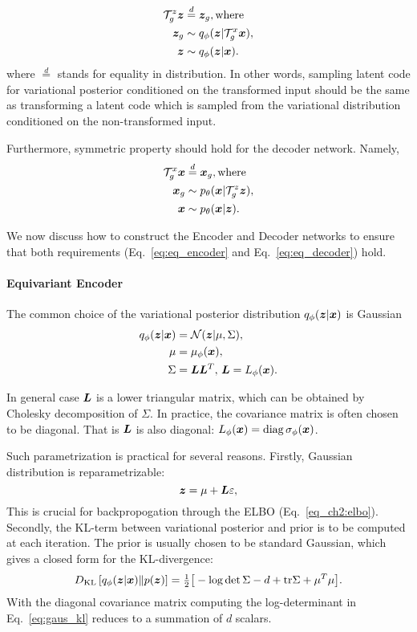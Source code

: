 \begin{align}
    \gT_g^z \vz &\stackrel{d}{=} \vz_g, \text{where}\label{eq:eq_encoder}\\ 
     \vz_g &\sim q_{\phi}(\vz| \gT_g^x \vx),\\
     \vz &\sim q_{\phi}(\vz| \vx).
\end{align}
where $\stackrel{d}{=}$ stands for equality in distribution. In other words, sampling latent code for variational posterior conditioned on the transformed input should be the same as transforming a latent code which is sampled from the variational distribution conditioned on the non-transformed input.  

Furthermore, symmetric property should hold for the decoder network. Namely,
\begin{align}
    \gT_g^x \vx &\stackrel{d}{=} \vx_g, \text{where} \label{eq:eq_decoder}\\
    \vx_g &\sim p_{\theta}(\vx| \gT_g^z \vz),\\
    \vx &\sim p_{\theta}(\vx| \vz).
\end{align}

We now discuss how to construct the Encoder and Decoder networks to ensure that both requirements (Eq.~\ref{eq:eq_encoder} and Eq.~\ref{eq:eq_decoder}) hold.

\paragraph{Equivariant Encoder}
The common choice of the variational posterior distribution $q_{\phi}({\bm{z}}|{\bm{x}})$ is Gaussian 
\begin{align}
    q_{\phi}(\vz|\vx) &= \mathcal{N}(\vz| \mu, \Sigma), \label{eq:var_posterior}\\
    \mu &= \mu_{\phi}(\vx), \notag \\
    \Sigma &= \mL\mL^T, \, \mL = L_{\phi}(\vx). \notag
\end{align}

In general case ${\bm{L}}$ is a lower triangular matrix, which can be obtained by Cholesky decomposition of $\Sigma$. 
In practice, the covariance matrix is often chosen to be diagonal. That is ${\bm{L}}$ is also diagonal: $L_{\phi}({\bm{x}}) = \operatorname{diag} \sigma_{\phi}({\bm{x}})$. 

Such parametrization is practical for several reasons. Firstly, Gaussian distribution is reparametrizable:
\begin{equation}
    {\bm{z}} = \mu +  {\bm{L}}\varepsilon,
\end{equation}
This is crucial for backpropogation through the ELBO (Eq.~\ref{eq_ch2:elbo}). Secondly, the KL-term between variational posterior and prior is to be computed at each iteration. The prior is usually chosen to be standard Gaussian, which gives a closed form for the KL-divergence:
\begin{align} \label{eq:gaus_kl}
    \KL{q_{\phi}(\vz|\vx)}{p(\vz)} = \tfrac{1}{2}\big[-\log\det\Sigma - d + 
    \text{tr}\Sigma + \mu^T\mu \big]. 
\end{align}
With the diagonal covariance matrix computing the log-determinant in Eq.~\ref{eq:gaus_kl} reduces to a summation of $d$ scalars.

